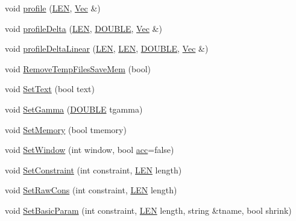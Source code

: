 \begin{DoxyCompactItemize}
\item 
void \hyperlink{class_rfold_1_1_paraso_r_a9132561f1bb3fb353fbadad884887b3d}{profile} (\hyperlink{energy__const_8hh_a05b49c662c073f89e86804f7856622a0}{L\+E\+N}, \hyperlink{namespace_rfold_aaf02f2c0c40c1dd572dbdd8bc1bde67d}{Vec} \&)
\item 
void \hyperlink{class_rfold_1_1_paraso_r_a87435a3e1db04c2fc45fae6e70dba23b}{profile\+Delta} (\hyperlink{energy__const_8hh_a05b49c662c073f89e86804f7856622a0}{L\+E\+N}, \hyperlink{energy__const_8hh_a8747af38b86aa2bbcda2f1b1aa0888c2}{D\+O\+U\+B\+L\+E}, \hyperlink{namespace_rfold_aaf02f2c0c40c1dd572dbdd8bc1bde67d}{Vec} \&)
\item 
void \hyperlink{class_rfold_1_1_paraso_r_a91ab16b811af25b9cda930affb82be10}{profile\+Delta\+Linear} (\hyperlink{energy__const_8hh_a05b49c662c073f89e86804f7856622a0}{L\+E\+N}, \hyperlink{energy__const_8hh_a05b49c662c073f89e86804f7856622a0}{L\+E\+N}, \hyperlink{energy__const_8hh_a8747af38b86aa2bbcda2f1b1aa0888c2}{D\+O\+U\+B\+L\+E}, \hyperlink{namespace_rfold_aaf02f2c0c40c1dd572dbdd8bc1bde67d}{Vec} \&)
\item 
void \hyperlink{class_rfold_1_1_paraso_r_a8ac6ab3e1b6a90b60cf06e34529f1380}{Remove\+Temp\+Files\+Save\+Mem} (bool)
\item 
void \hyperlink{class_rfold_1_1_paraso_r_ad932e0f36649423c72c6798de29d693e}{Set\+Text} (bool text)
\item 
void \hyperlink{class_rfold_1_1_paraso_r_a374fad3a51b681d4dbb38fc7b4590609}{Set\+Gamma} (\hyperlink{energy__const_8hh_a8747af38b86aa2bbcda2f1b1aa0888c2}{D\+O\+U\+B\+L\+E} tgamma)
\item 
void \hyperlink{class_rfold_1_1_paraso_r_a0b8eba51a56f40f80473891e187d3693}{Set\+Memory} (bool tmemory)
\item 
void \hyperlink{class_rfold_1_1_paraso_r_a5415106a8e08ad28a53cfc88329358e9}{Set\+Window} (int window, bool \hyperlink{class_rfold_1_1_paraso_r_a70ce59c8bc0a2387ca63584e73679a09}{acc}=false)
\item 
void \hyperlink{class_rfold_1_1_paraso_r_ac1b524cf7407a1f9f2efef01435e2502}{Set\+Constraint} (int constraint, \hyperlink{energy__const_8hh_a05b49c662c073f89e86804f7856622a0}{L\+E\+N} length)
\item 
void \hyperlink{class_rfold_1_1_paraso_r_a9094d5a45d3ac46abfdc38c86378fc02}{Set\+Raw\+Cons} (int constraint, \hyperlink{energy__const_8hh_a05b49c662c073f89e86804f7856622a0}{L\+E\+N} length)
\item 
void \hyperlink{class_rfold_1_1_paraso_r_ac9dee511e85054868c293dca0ad4a64a}{Set\+Basic\+Param} (int constraint, \hyperlink{energy__const_8hh_a05b49c662c073f89e86804f7856622a0}{L\+E\+N} length, string \&tname, bool shrink)

\end{DoxyCompactItemize}
